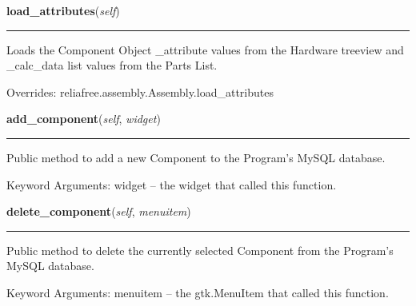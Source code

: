     \vspace{0.5ex}

\hspace{.8\funcindent}\begin{boxedminipage}{\funcwidth}

    \raggedright \textbf{load\_attributes}(\textit{self})

    \vspace{-1.5ex}

    \rule{\textwidth}{0.5\fboxrule}
\setlength{\parskip}{2ex}
    Loads the Component Object \_attribute values from the Hardware 
    treeview and \_calc\_data list values from the Parts List.

\setlength{\parskip}{1ex}
      Overrides: reliafree.assembly.Assembly.load\_attributes

    \end{boxedminipage}

    \label{reliafree:component:Component:add_component}

    \vspace{0.5ex}

\hspace{.8\funcindent}\begin{boxedminipage}{\funcwidth}

    \raggedright \textbf{add\_component}(\textit{self}, \textit{widget})

    \vspace{-1.5ex}

    \rule{\textwidth}{0.5\fboxrule}
\setlength{\parskip}{2ex}
    Public method to add a new Component to the Program's MySQL database.

    Keyword Arguments: widget -- the widget that called this function.

\setlength{\parskip}{1ex}
    \end{boxedminipage}

    \label{reliafree:component:Component:delete_component}

    \vspace{0.5ex}

\hspace{.8\funcindent}\begin{boxedminipage}{\funcwidth}

    \raggedright \textbf{delete\_component}(\textit{self}, \textit{menuitem})

    \vspace{-1.5ex}

    \rule{\textwidth}{0.5\fboxrule}
\setlength{\parskip}{2ex}
    Public method to delete the currently selected Component from the 
    Program's MySQL database.

    Keyword Arguments: menuitem -- the gtk.MenuItem that called this 
    function.

\setlength{\parskip}{1ex}
    \end{boxedminipage}

